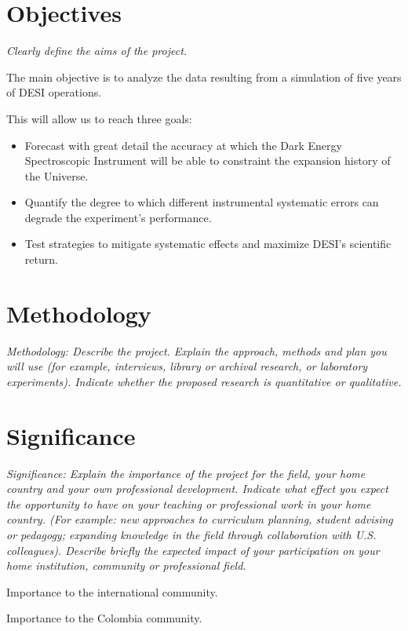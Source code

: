 \documentclass[12pt]{article}
\begin{document}
{}





\section*{Objectives}
\textit{Clearly define the aims of the project.}

The main objective is to analyze the data resulting from a simulation
of five years of DESI operations.  

This will allow us to reach three goals:
\begin{itemize}
\item Forecast with great detail the accuracy at which the Dark Energy
  Spectroscopic Instrument will be able to constraint the expansion
  history of the Universe.  
\item Quantify the degree to which different instrumental systematic
  errors can degrade the experiment's performance.
\item Test strategies to mitigate systematic effects and maximize
  DESI's scientific return.
\end{itemize}
\section*{Methodology}
\textit{Methodology: Describe the project. Explain the approach, methods and
plan you will use (for example, interviews, library or archival
research, or laboratory experiments). Indicate whether the proposed
research is quantitative or qualitative. }



\section*{Significance}
\textit{Significance: Explain the importance of the project for the field,
your home country and your own professional development. Indicate
what effect you expect the opportunity to have on your teaching or
professional work in your home country. (For example: new approaches
to curriculum planning, student advising or pedagogy; expanding
knowledge in the field through collaboration with
U.S. colleagues). Describe briefly the expected impact of your
participation on your home institution, community or professional
field. }


Importance to the international community.

Importance to the Colombia community.
\end{document}
